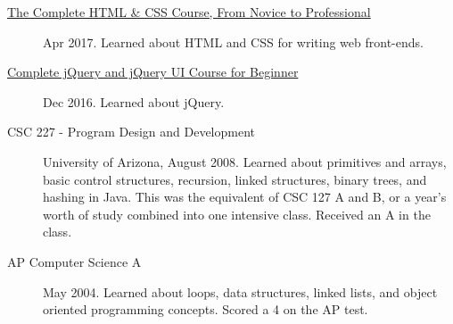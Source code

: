 \documentclass{article}
\begin{document}
\begin{description}
  \item [\href{https://www.udemy.com/certificate/UC-QZDWYX3V}{The Complete HTML \& CSS Course, From Novice to Professional}] Apr 2017. Learned about HTML and CSS for writing web front-ends.
  \item [\href{https://www.udemy.com/certificate/UC-4V285L2N}{Complete jQuery and jQuery UI Course for Beginner}] Dec 2016. Learned about jQuery.
  \item [CSC 227 - Program Design and Development] University of Arizona, August 2008. Learned about primitives and arrays, basic control structures, recursion, linked structures, binary trees, and hashing in Java. This was the equivalent of CSC 127 A and B, or a year's worth of study combined into one intensive class. Received an A in the class.
  \item [AP Computer Science A] May 2004. Learned about loops, data structures, linked lists, and object oriented programming concepts. Scored a 4 on the AP test.
\end{description}
\end{document}
